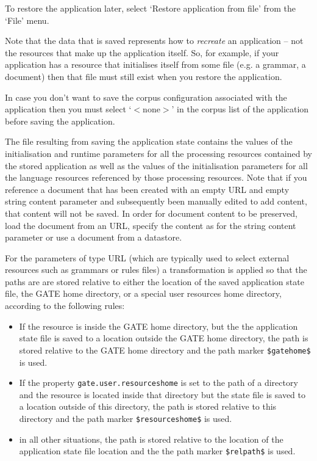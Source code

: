 To restore the application later, select `Restore application from file'
from the `File' menu.

Note that the data that is saved represents how to {\it recreate} an
application -- not the resources that make up the application itself. So,
for example, if your application has a resource that initialises itself from
some file (e.g. a grammar, a document) then that file must still exist when
you restore the application.

In case you don't want to save the corpus configuration associated with the
application then you must select `$<$none$>$' in the corpus list of the
application before saving the application.

The file resulting from saving the application state contains the values of the
initialisation and runtime parameters for all the processing resources contained by the
stored application as well as the values of the initialisation parameters for 
all the language resources referenced by those processing resources. Note that
if you reference a document that has been created with an empty URL and empty
string content parameter and subsequently been manually edited to add content,
that content will not be saved. In order for document content to be preserved,
load the document from an URL, specify the content as for the string content
parameter or use a document from a datastore.

For the parameters of type URL (which are typically used to
select external resources such as grammars or rules files) a transformation is
applied so that  
the paths are are stored relative to either the location of the saved application 
state file, the GATE home directory, or a special user resources home directory,
according to the following rules:
\begin{itemize}
\item If the resource is inside the GATE home directory, but the the application
  state file is saved to a location outside the GATE home directory, the path
  is stored relative to the GATE home directory and the path marker 
  \verb=$gatehome$=
  is used.
\item If the property \texttt{gate.user.resourceshome} is set to the path of
  a directory and the resource
  is located inside that directory but the state file is saved to a location 
  outside of this directory, the path is stored relative to this directory
  and the path marker \verb=$resourceshome$= is used.
\item in all other situations, the path is stored relative to the location of
  the application state file location and the the path marker \verb=$relpath$=
  is used.
\end{itemize}


